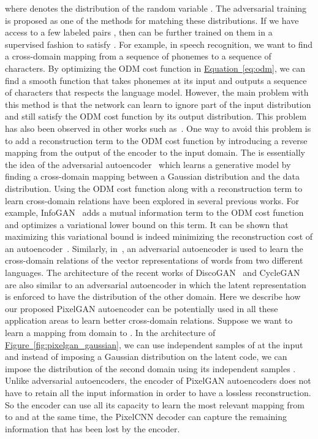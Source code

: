 \documentclass{article}
\newcommand{\myeq}[1]{\hyperref[eq:#1]{Equation~\ref*{eq:#1}}}
\newcommand{\myfig}[1]{\hyperref[fig:#1]{Figure~\ref*{fig:#1}}}
\begin{document}
where  denotes the distribution of the random variable . The adversarial training is proposed as one of the methods for matching these distributions. If we have access to a few labeled pairs , then  can be further trained on them in a supervised fashion to satisfy . For example, in speech recognition, we want to find a cross-domain mapping from a sequence of phonemes to a sequence of characters. By optimizing the ODM cost function in \myeq{odm}, we can find a smooth function  that takes phonemes at its input and outputs a sequence of characters that respects the language model. However, the main problem with this method is that the network can learn to ignore part of the input distribution and still satisfy the ODM cost function by its output distribution. This problem has also been observed in other works such as~\citep{discogan}. One way to avoid this problem is to add a reconstruction term to the ODM cost function by introducing a reverse mapping from the output of the encoder to the input domain. The is essentially the idea of the adversarial autoencoder~\citep{aae} which learns a generative model by finding a cross-domain mapping between a Gaussian distribution and the data distribution. Using the ODM cost function along with a reconstruction term to learn cross-domain relations have been explored in several previous works. For example, InfoGAN~\citep{infogan} adds a mutual information term to the ODM cost function and optimizes a variational lower bound on this term. It can be shown that maximizing this variational bound is indeed minimizing the reconstruction cost of an autoencoder~\citep{im}. Similarly, in~\citep{cross-domain-nlp, zhangadversarial}, an adversarial autoencoder is used to learn the cross-domain relations of the vector representations of words from two different languages. The architecture of the recent works of DiscoGAN~\citep{discogan} and CycleGAN~\citep{cyclegan} are also similar to an adversarial autoencoder in which the latent representation is enforced to have the distribution of the other domain. Here we describe how our proposed PixelGAN autoencoder can be potentially used in all these application areas to learn better cross-domain relations. Suppose we want to learn a mapping from domain  to . In the architecture of \myfig{pixelgan_gaussian}, we can use independent samples of  at the input and instead of imposing a Gaussian distribution on the latent code, we can impose the distribution of the second domain using its independent samples . Unlike adversarial autoencoders, the encoder of PixelGAN autoencoders does not have to retain all the input information in order to have a lossless reconstruction. So the encoder can use all its capacity to learn the most relevant mapping from  to  and at the same time, the PixelCNN decoder can capture the remaining information that has been lost by the encoder.
\end{document}

